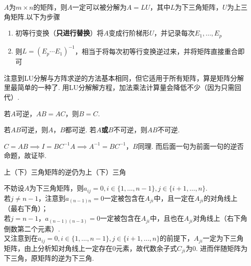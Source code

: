 \begin{myalgorithm}[LU分解]
$A$为$m\times n$的矩阵，则$A$一定可以被分解为$A=LU$，其中$L$为下三角矩阵，$U$为上三角矩阵.以下为步骤
\begin{enumerate}
	\item 初等行变换（\textbf{只进行替换}）将$A$变成行阶梯形$U$，并记录每次$E_1,\dots,E_p$
	\item 则$L=(E_p\cdots E_1)^{-1}$，相当于将每次初等行变换逆过来，并将矩阵直接重合即可
\end{enumerate}
\end{myalgorithm}
\par 注意到LU分解与方阵求逆的方法基本相同，但它适用于所有矩阵，算是矩阵分解里最简单的一种了. 用LU分解解方程，加法乘法计算量会降低不少（因为只需回代）.
\begin{proposition}[消去律]
若$A$可逆，$AB=AC$，则$B=C$.
\end{proposition}
\begin{proposition}
若$AB$可逆，则$A$，$B$都可逆. 若$A$\textbf{或}$B$不可逆，则$AB$不可逆.
\end{proposition}
\begin{analysis}
$C=AB\implies I=BC^{-1}A\implies A^{-1}=BC^{-1}$，$B$同理. 而后面一句为前面一句的逆否命题，故证毕.
\end{analysis}
\begin{theorem}
上（下）三角矩阵的逆仍为上（下）三角
\end{theorem}
\begin{analysis}
不妨设$A$为下三角矩阵，则$a_{ij}=0,i\in\{1,\dots,n-1\},j\in\{i+1,\dots,n\}$.\\
若$j\ne n-1$，注意到$a_{(n-1)n}=0$一定被包含在$A_{ji}$中，且一定在$A_{ji}$的对角线上（最右下角）；\\
若$j=n-1$，$a_{(n-1)(n-3)}=0$一定被包含在$A_{ji}$中，且也在$A_{ji}$对角线上（右下角倒数第二个元素）.\\
又注意到在$a_{ij}=0,i\in\{1,\dots,n-1\},j\in\{i+1,\dots,n\}$的前提下，$A_{ji}$一定为下三角矩阵，由上分析知对角线上一定存在$0$元素，故代数余子式$C_{ji}$为$0$. 进而伴随矩阵为下三角，原矩阵的逆为下三角.
\end{analysis}

